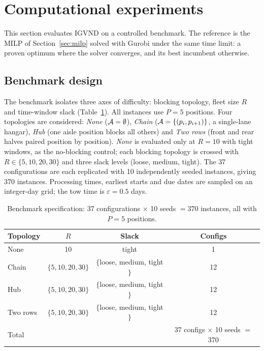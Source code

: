 \section{Computational experiments}
\label{sec:experiments}

This section evaluates IGVND on a controlled benchmark.  The reference
is the MILP of Section~\ref{sec:milp} solved with Gurobi under the same time
limit: a proven optimum where the solver converges, and its best
incumbent otherwise.

\subsection{Benchmark design}
\label{sec:benchmark}

The benchmark isolates three axes of difficulty: blocking topology,
fleet size $R$ and time-window slack (Table~\ref{tab:benchmark}).  All
instances use $P = 5$ positions.  Four topologies are considered:
\emph{None} ($\mathcal{A} = \emptyset$), \emph{Chain}
($\mathcal{A} = \{(p_i, p_{i+1})\}$, a single-lane hangar), \emph{Hub} (one
aisle position blocks all others) and \emph{Two rows} (front and rear
halves paired position by position).  \emph{None} is evaluated only at
$R = 10$ with tight windows, as the no-blocking control; each blocking
topology is crossed with $R \in \{5, 10, 20, 30\}$ and three slack levels
(loose, medium, tight).  The 37 configurations are each replicated with
10 independently seeded instances, giving 370 instances.  Processing
times, earliest starts and due dates are sampled on an integer-day grid;
the tow time is $\varepsilon = 0.5$ days.

\begin{table}[htbp]
  \centering
  \caption{Benchmark specification: 37 configurations $\times$ 10 seeds
           $= 370$ instances, all with $P = 5$ positions.}
  \label{tab:benchmark}
  \begin{tabular}{lccc}
    \toprule
    Topology & $R$ & Slack & Configs \\
    \midrule
    None & 10 & tight & 1 \\
    Chain & $\{5, 10, 20, 30\}$ & $\{$loose, medium, tight$\}$ & 12 \\
    Hub & $\{5, 10, 20, 30\}$ & $\{$loose, medium, tight$\}$ & 12 \\
    Two rows & $\{5, 10, 20, 30\}$ & $\{$loose, medium, tight$\}$ & 12 \\
    \midrule
    \multicolumn{3}{l}{Total} & 37 configs $\times$ 10 seeds $=$ 370 \\
    \bottomrule
  \end{tabular}
\end{table}

